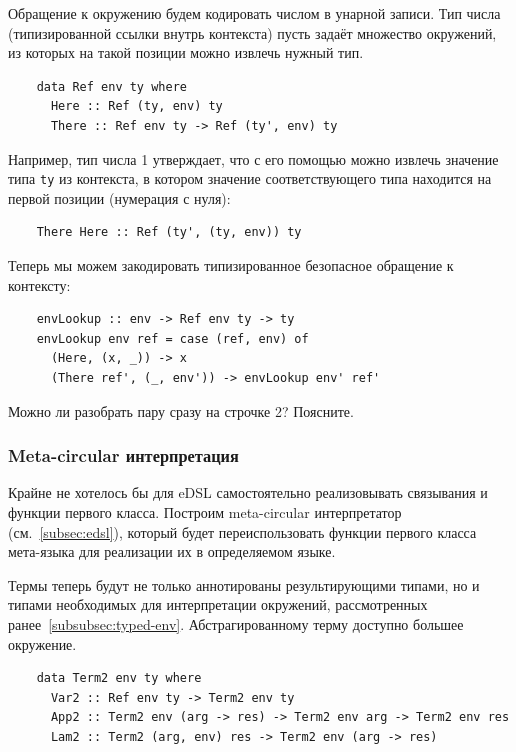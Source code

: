 Обращение к окружению будем кодировать числом в унарной записи.
Тип числа (типизированной ссылки внутрь контекста) пусть задаёт множество окружений, из которых на такой позиции можно извлечь нужный тип.
\begin{verbatim}
    data Ref env ty where
      Here :: Ref (ty, env) ty
      There :: Ref env ty -> Ref (ty', env) ty
\end{verbatim}
Например, тип числа 1 утверждает, что с его помощью можно извлечь значение типа \texttt{ty} из контекста, в котором значение соответствующего типа находится на первой позиции (нумерация с нуля):
\begin{verbatim}
    There Here :: Ref (ty', (ty, env)) ty
\end{verbatim}

Теперь мы можем закодировать типизированное безопасное обращение к контексту:
\begin{verbatim}
    envLookup :: env -> Ref env ty -> ty
    envLookup env ref = case (ref, env) of
      (Here, (x, _)) -> x
      (There ref', (_, env')) -> envLookup env' ref'
\end{verbatim}

\begin{task}
    Можно ли разобрать пару сразу на строчке 2?
    Поясните.
\end{task}

\subsubsection{Meta-circular интерпретация} \label{subsubsec:meta-circular-initial}

Крайне не хотелось бы для eDSL самостоятельно реализовывать связывания и функции первого класса.
Построим meta-circular интерпретатор (см.~\ref{subsec:edsl}), который будет переиспользовать функции первого класса мета-языка для реализации их в определяемом языке.

Термы теперь будут не только аннотированы результирующими типами, но и типами необходимых для интерпретации окружений, рассмотренных ранее~\ref{subsubsec:typed-env}.
Абстрагированному терму доступно большее окружение.

\begin{verbatim}
    data Term2 env ty where
      Var2 :: Ref env ty -> Term2 env ty
      App2 :: Term2 env (arg -> res) -> Term2 env arg -> Term2 env res
      Lam2 :: Term2 (arg, env) res -> Term2 env (arg -> res)
\end{verbatim}

